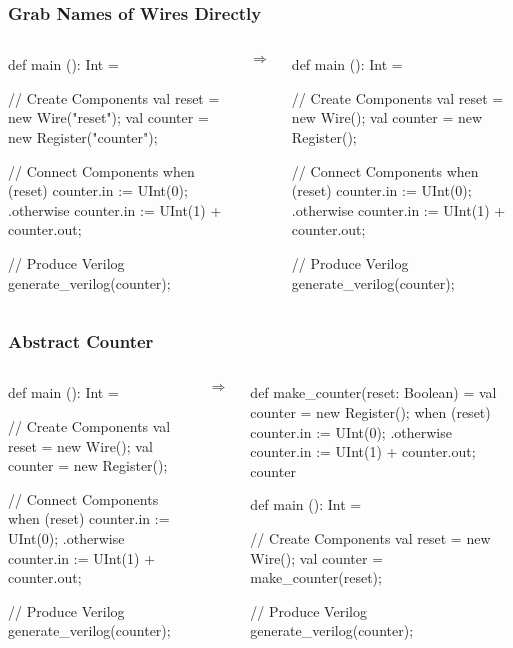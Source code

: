\begin{frame}[fragile]
\frametitle{Grab Names of Wires Directly}
\begin{columns}
{
\begin{scala}
def main (): Int = {
  // Create Components
  val reset   = new Wire("reset");
  val counter = new Register("counter");

  // Connect Components
  when (reset) {
    counter.in := UInt(0);
  } .otherwise {
    counter.in := UInt(1) + counter.out;
  }

  // Produce Verilog
  generate_verilog(counter);
}
\end{scala}
}
\begin{center}
$\Rightarrow$
\end{center}
{
\begin{scala}
def main (): Int = {
  // Create Components
  val reset   = new Wire();
  val counter = new Register();

  // Connect Components
  when (reset) {
    counter.in := UInt(0);
  } .otherwise {
    counter.in := UInt(1) + counter.out;
  }

  // Produce Verilog
  generate_verilog(counter);
}
\end{scala}
}
\end{columns}
\end{frame}

\begin{frame}[fragile]
\frametitle{Abstract Counter}
\begin{columns}
{
\begin{scala}
def main (): Int = {
  // Create Components
  val reset   = new Wire();
  val counter = new Register();

  // Connect Components
  when (reset) {
    counter.in := UInt(0);
  } .otherwise {
    counter.in := UInt(1) + counter.out;
  }

  // Produce Verilog
  generate_verilog(counter);
}
\end{scala}
}
\begin{center}
$\Rightarrow$
\end{center}
{
\begin{scala}
def make_counter(reset: Boolean) = {
  val counter = new Register();
  when (reset) {
    counter.in := UInt(0);
  } .otherwise {
    counter.in := UInt(1) + counter.out;
  }
  counter
}

def main (): Int = {
  // Create Components
  val reset   = new Wire();
  val counter = make_counter(reset);

  // Produce Verilog
  generate_verilog(counter);
}
\end{scala}
}
\end{columns}
\end{frame}

